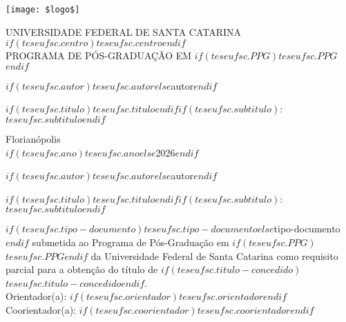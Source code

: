 \begin{center}
\thispagestyle{empty}
\onehalfspacing

\texttt{[image: \$logo\$]}

UNIVERSIDADE FEDERAL DE SANTA CATARINA\\
\MakeUppercase{$if(teseufsc.centro)$$teseufsc.centro$$endif$}\\
PROGRAMA DE PÓS-GRADUAÇÃO EM \MakeUppercase{$if(teseufsc.PPG)$$teseufsc.PPG$$endif$}\\
\vspace{7.5em}

$if(teseufsc.autor)$$teseufsc.autor$$else$autor$endif$

\vspace{7.5em}

\textbf{$if(teseufsc.titulo)$$teseufsc.titulo$$endif$}$if(teseufsc.subtitulo)$: {$teseufsc.subtitulo$}$endif$

\vfill

Florianópolis\\
$if(teseufsc.ano)$$teseufsc.ano$$else$2026$endif$

\end{center}

\clearpage \thispagestyle{empty} \setcounter{page}{1}
\pagestyle{plain}
\onehalfspacing

\begin{center}

$if(teseufsc.autor)$$teseufsc.autor$$else$autor$endif$

\vspace{13.5em}

\textbf{$if(teseufsc.titulo)$$teseufsc.titulo$$endif$}$if(teseufsc.subtitulo)$: {$teseufsc.subtitulo$}$endif$

\end{center}

\vspace{7.5em}

\begin{flushright}
\begin{minipage}{0.5\textwidth}
\footnotesize
\singlespacing
\justifying
\noindent
$if(teseufsc.tipo-documento)$$teseufsc.tipo-documento$$else$tipo-documento$endif$ submetida ao Programa de Pós-Graduação em $if(teseufsc.PPG)$$teseufsc.PPG$$endif$ da Universidade Federal de Santa Catarina como requisito parcial para a obtenção do título de $if(teseufsc.titulo-concedido)$$teseufsc.titulo-concedido$$endif$.\\

\noindent
Orientador(a): $if(teseufsc.orientador)$$teseufsc.orientador$$endif$ \\
Coorientador(a): $if(teseufsc.coorientador)$$teseufsc.coorientador$$endif$

\end{minipage}
\end{flushright}


